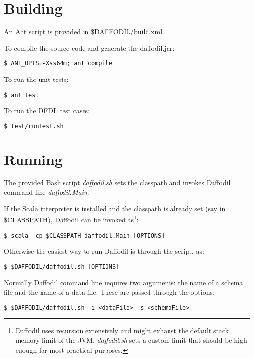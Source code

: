 \documentclass[a4paper,10pt]{article}
\begin{document}
\section{Building}

An Ant script is provided in \$DAFFODIL/build.xml.

To compile the source code and generate the daffodil.jar:

\begin{verbatim}
$ ANT_OPTS=-Xss64m; ant compile 
\end{verbatim}

To run the unit tests:

\begin{verbatim}
$ ant test
\end{verbatim}

To run the DFDL test cases:

\begin{verbatim}
$ test/runTest.sh
\end{verbatim}

\section{Running}

The provided Bash script \emph{daffodil.sh} sets the classpath and invokes Daffodil command line \emph{daffodil.Main}. 

If the Scala interpreter is installed and the classpath is already set (say in \$CLASSPATH), Daffodil can be invoked as\footnote{Daffodil uses recursion extensively and might exhaust the default stack memory limit of the JVM. \emph{daffodil.sh} sets a custom limit that should be high enough for most practical purposes.}:

\begin{verbatim}
$ scala -cp $CLASSPATH daffodil.Main [OPTIONS]
\end{verbatim}

Otherwise the easiest way to run Daffodil is through the script, as:

\begin{verbatim}
$ $DAFFODIL/daffodil.sh [OPTIONS]
\end{verbatim}


Normally Daffodil command line requires two arguments: the name of a schema file and the name of a data file. These are passed through the options:

\begin{verbatim}
$ $DAFFODIL/daffodil.sh -i <dataFile> -s <schemaFile>
\end{verbatim}
\end{document}
